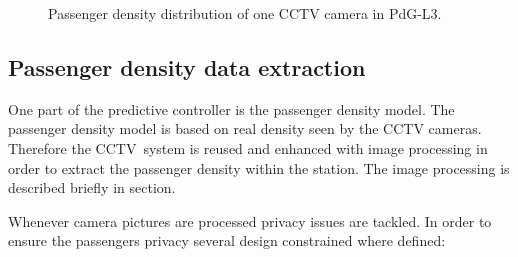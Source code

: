 \begin{figure}[htbp]

  \centering

  \hfill

  \caption{Passenger density distribution of one CCTV camera in PdG-L3.}
  \label{fig:PdG-L3_CCTVcameras}

\end{figure}


\subsection{Passenger density data extraction}
\label{sec:PassengerDensityDataExtraction}

One part of the predictive controller is the passenger density model. The passenger density model is based on real density seen by the CCTV cameras. Therefore the CCTV~system is reused and enhanced with image processing in order to extract the passenger density within the station. The image processing is described briefly in section.

Whenever camera pictures are processed privacy issues are tackled. In order to ensure the passengers privacy several design constrained where defined:

